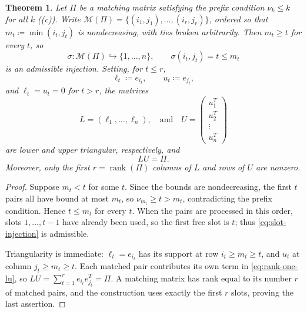 \documentclass[preprint,12pt]{elsarticle}
\theoremstyle{plain}
\newtheorem{theorem}{Theorem}
\theoremstyle{nonumberplain}
\newtheorem{proof}{Proof}
\numberwithin{equation}{section}
\DeclareMathOperator{\rk}{rank}
\newcommand{\M}{\mathcal{M}}
\numberwithin{theorem}{section}
\begin{document}
\begin{theorem}\label{thm:lu-matching}
  Let $\Pi$ be a matching matrix satisfying the prefix condition $\nu_k \le k$ for all $k$ ((c)). Write $\M(\Pi)=\{(i_1,j_1),\ldots,(i_r,j_r)\}$, ordered so that $m_t\coloneq\min(i_t,j_t)$ is nondecreasing, with ties broken arbitrarily. Then $m_t\ge t$ for every $t$, so
  \begin{equation}\label{eq:slot-injection}
    \sigma \colon \M(\Pi) \hookrightarrow \{1, \ldots, n\},
    \qquad
    \sigma(i_t,j_t)=t\le m_t
  \end{equation}
  is an admissible injection. Setting, for $t\le r$,
  \[
    \ell_t \coloneq e_{i_t},
    \qquad
    u_t \coloneq e_{j_t},
  \]
  and $\ell_t=u_t=0$ for $t>r$, the matrices
  \[
    L = (\ell_1, \ldots, \ell_n), \quad
    \text{and} \quad
    U =
    \begin{pmatrix}
      u_1^T \\ u_2^T \\ \vdots \\ u_n^T
    \end{pmatrix}
  \]
  are lower and upper triangular, respectively, and
  \[
    L U = \Pi.
  \]
  Moreover, only the first $r=\rk(\Pi)$ columns of $L$ and rows of $U$ are nonzero.
\end{theorem}

\begin{proof}
  Suppose $m_t<t$ for some $t$. Since the bounds are nondecreasing, the first $t$ pairs all have bound at most $m_t$, so $\nu_{m_t}\ge t>m_t$, contradicting the prefix condition. Hence $t\le m_t$ for every $t$. When the pairs are processed in this order, slots $1,\ldots,t-1$ have already been used, so the first free slot is $t$; thus \cref{eq:slot-injection} is admissible.

  Triangularity is immediate: $\ell_t=e_{i_t}$ has its support at row $i_t\ge m_t\ge t$, and $u_t$ at column $j_t\ge m_t\ge t$. Each matched pair contributes its own term in \cref{eq:rank-one-lu}, so $LU=\sum_{t=1}^r e_{i_t}e_{j_t}^T=\Pi$. A matching matrix has rank equal to its number $r$ of matched pairs, and the construction uses exactly the first $r$ slots, proving the last assertion.
\end{proof}
\end{document}
